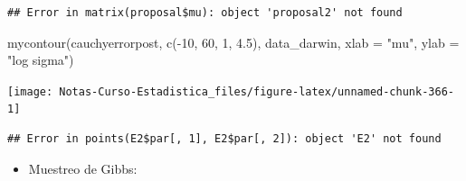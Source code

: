 \documentclass[
  12pt,
]{book}
\newenvironment{Shaded}{\begin{snugshade}}{\end{snugshade}}
\newcommand{\AttributeTok}[1]{\textcolor[rgb]{0.77,0.63,0.00}{#1}}
\newcommand{\DecValTok}[1]{\textcolor[rgb]{0.00,0.00,0.81}{#1}}
\newcommand{\FloatTok}[1]{\textcolor[rgb]{0.00,0.00,0.81}{#1}}
\newcommand{\FunctionTok}[1]{\textcolor[rgb]{0.00,0.00,0.00}{#1}}
\newcommand{\NormalTok}[1]{#1}
\newcommand{\OtherTok}[1]{\textcolor[rgb]{0.56,0.35,0.01}{#1}}
\newcommand{\SpecialCharTok}[1]{\textcolor[rgb]{0.00,0.00,0.00}{#1}}
\newcommand{\StringTok}[1]{\textcolor[rgb]{0.31,0.60,0.02}{#1}}
\providecommand{\tightlist}{%
  \setlength{\itemsep}{0pt}\setlength{\parskip}{0pt}}
\theoremstyle{definition}
\theoremstyle{definition}
\theoremstyle{definition}
\theoremstyle{definition}
\theoremstyle{remark}
\begin{document}
\begin{verbatim}
## Error in matrix(proposal$mu): object 'proposal2' not found
\end{verbatim}

\begin{Shaded}
\begin{Highlighting}[]
\FunctionTok{mycontour}\NormalTok{(cauchyerrorpost, }\FunctionTok{c}\NormalTok{(}\SpecialCharTok{{-}}\DecValTok{10}\NormalTok{, }\DecValTok{60}\NormalTok{, }\DecValTok{1}\NormalTok{, }\FloatTok{4.5}\NormalTok{), data\_darwin,}
    \AttributeTok{xlab =} \StringTok{"mu"}\NormalTok{, }\AttributeTok{ylab =} \StringTok{"log sigma"}\NormalTok{)}
\end{Highlighting}
\end{Shaded}

\begin{center}\texttt{[image: Notas-Curso-Estadistica\_files/figure-latex/unnamed-chunk-366-1]} \end{center}

\begin{Shaded}
\end{Shaded}

\begin{verbatim}
## Error in points(E2$par[, 1], E2$par[, 2]): object 'E2' not found
\end{verbatim}

\begin{itemize}
\tightlist
\item
  Muestreo de Gibbs:
\end{itemize}

\begin{Shaded}
\end{Shaded}
\end{document}
